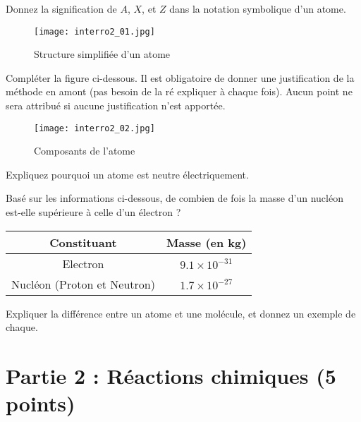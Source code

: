 \documentclass{exam}
\begin{document}
\begin{questions}
  \question[1] Donnez la signification de $A$, $X$, et $Z$ dans la notation symbolique d'un atome.

\begin{figure}[H]
    \centering
    \texttt{[image: interro2\_01.jpg]}
    \caption{Structure simplifiée d'un atome}
\end{figure} 

  \question[1.5] Compléter la figure ci-dessous. Il est obligatoire de donner une justification de la méthode en amont (pas besoin de la ré expliquer à chaque fois). Aucun point ne sera attribué si aucune justification n'est apportée.

  \begin{figure}[H]
    \centering
    \texttt{[image: interro2\_02.jpg]}
    \caption{Composants de l'atome}
\end{figure} 

  \question[0.5] Expliquez pourquoi un atome est neutre électriquement.

  \question[1.5] Basé sur les informations ci-dessous, de combien de fois la masse d’un nucléon est-elle supérieure à celle d’un électron ? 

  \begin{center}
  \begin{tabular}{SS}
    \toprule
    {Constituant} & {Masse (en \si{kg})} \\
    \midrule
    {Electron} & {\(9.1 \times 10^{-31}\)} \\
    {Nucléon (Proton et Neutron)} & {\(1.7 \times 10^{-27}\)} \\
    \bottomrule
  \end{tabular}
\end{center}
  
  \question[0.5] Expliquer la différence entre un atome et une molécule, et donnez un exemple de chaque.

\end{questions}

\section*{Partie 2 : Réactions chimiques (5 points)}
\end{document}
